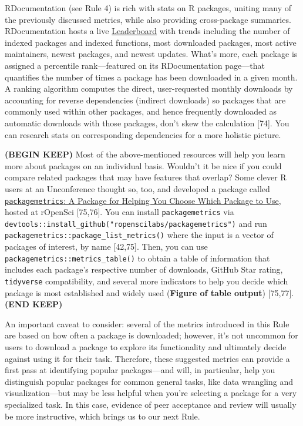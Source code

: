 \documentclass[10pt,letterpaper]{article}
\begin{document}
RDocumentation (see Rule 4) is rich with stats on R packages, uniting
many of the previously discussed metrics, while also providing
cross-package summaries. RDocumentation hosts a live
\href{https://www.rdocumentation.org/trends}{Leaderboard} with trends
including the number of indexed packages and indexed functions, most
downloaded packages, most active maintainers, newest packages, and
newest updates. What's more, each package is assigned a percentile
rank---featured on its RDocumentation page---that quantifies the number
of times a package has been downloaded in a given month. A ranking
algorithm computes the direct, user-requested monthly downloads by
accounting for reverse dependencies (indirect downloads) so packages
that are commonly used within other packages, and hence frequently
downloaded as automatic downloads with those packages, don't skew the
calculation {[}74{]}. You can research stats on corresponding
dependencies for a more holistic picture.

\textbf{(BEGIN KEEP)} Most of the above-mentioned resources will help
you learn more about packages on an individual basis. Wouldn't it be
nice if you could compare related packages that may have features that
overlap? Some clever R users at an Unconference thought so, too, and
developed a package called
\href{https://docs.ropensci.org/packagemetrics/}{\texttt{packagemetrics}:
A Package for Helping You Choose Which Package to Use}, hosted at
rOpenSci {[}75,76{]}. You can install \texttt{packagemetrics} via
\texttt{devtools::install\_github("ropenscilabs/packagemetrics")} and
run \texttt{packagemetrics::package\_list\_metrics()} where the input is
a vector of packages of interest, by name {[}42,75{]}. Then, you can use
\texttt{packagemetrics::metrics\_table()} to obtain a table of
information that includes each package's respective number of downloads,
GitHub Star rating, \texttt{tidyverse} compatibility, and several more
indicators to help you decide which package is most established and
widely used (\textbf{Figure of table output}) {[}75,77{]}.\textbf{(END
KEEP)}

An important caveat to consider: several of the metrics introduced in
this Rule are based on how often a package is downloaded; however, it's
not uncommon for users to download a package to explore its
functionality and ultimately decide against using it for their task.
Therefore, these suggested metrics can provide a first pass at
identifying popular packages---and will, in particular, help you
distinguish popular packages for common general tasks, like data
wrangling and visualization---but may be less helpful when you're
selecting a package for a very specialized task. In this case, evidence
of peer acceptance and review will usually be more instructive, which
brings us to our next Rule.
\end{document}

